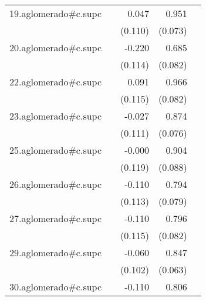 {\begin{longtable}{l*{4}{D{.}{.}{-1}}}
\addlinespace
19.aglomerado#c.supc&                     &       0.047         &       0.951\sym{***}&                     \\
            &                     &     (0.110)         &     (0.073)         &                     \\
\addlinespace
20.aglomerado#c.supc&                     &      -0.220         &       0.685\sym{***}&                     \\
            &                     &     (0.114)         &     (0.082)         &                     \\
\addlinespace
22.aglomerado#c.supc&                     &       0.091         &       0.966\sym{***}&                     \\
            &                     &     (0.115)         &     (0.082)         &                     \\
\addlinespace
23.aglomerado#c.supc&                     &      -0.027         &       0.874\sym{***}&                     \\
            &                     &     (0.111)         &     (0.076)         &                     \\
\addlinespace
25.aglomerado#c.supc&                     &      -0.000         &       0.904\sym{***}&                     \\
            &                     &     (0.119)         &     (0.088)         &                     \\
\addlinespace
26.aglomerado#c.supc&                     &      -0.110         &       0.794\sym{***}&                     \\
            &                     &     (0.113)         &     (0.079)         &                     \\
\addlinespace
27.aglomerado#c.supc&                     &      -0.110         &       0.796\sym{***}&                     \\
            &                     &     (0.115)         &     (0.082)         &                     \\
\addlinespace
29.aglomerado#c.supc&                     &      -0.060         &       0.847\sym{***}&                     \\
            &                     &     (0.102)         &     (0.063)         &                     \\
\addlinespace
30.aglomerado#c.supc&                     &      -0.110         &       0.806\sym{***}&                     \\

\end{longtable}}
